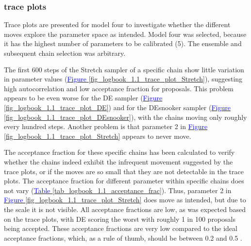 \subsubsection{trace plots} %
Trace plots are presented for model four to investigate whether the different moves explore the parameter space as intended. Model four was selected, because it has the highest number of parameters to be calibrated (5). The ensemble and subsequent chain selection was arbitrary. 

The first 600 steps of the Stretch sampler of a specific chain show little variation in parameter values (\hyperref[fig_logbook_1.1_trace_plot_Stretch]{\textcolor{blue}{Figure }\ref{fig_logbook_1.1_trace_plot_Stretch}}), suggesting high autocorrelation and low acceptance fraction for proposals. This problem appears to be even worse for the DE sampler (\hyperref[fig_logbook_1.1_trace_plot_DE]{\textcolor{blue}{Figure }\ref{fig_logbook_1.1_trace_plot_DE}}) and for the DEsnooker sampler (\hyperref[fig_logbook_1.1_trace_plot_DEsnooker]{\textcolor{blue}{Figure }\ref{fig_logbook_1.1_trace_plot_DEsnooker}}), with the chains moving only roughly every hundred steps. Another problem is that parameter 2 in \hyperref[fig_logbook_1.1_trace_plot_Stretch]{\textcolor{blue}{Figure }\ref{fig_logbook_1.1_trace_plot_Stretch}} appears to never move. 

The acceptance fraction for these specific chains has been calculated to verify whether the chains indeed exhibit the infrequent movement suggested by the trace plots, or if the moves are so small that they are not detectable in the trace plots. The acceptance fraction for different parameter within specific chains does not vary (\hyperref[tab_logbook_1.1_acceptance_frac]{\textcolor{blue}{Table }\ref{tab_logbook_1.1_acceptance_frac}}). Thus, parameter 2 in \hyperref[fig_logbook_1.1_trace_plot_Stretch]{\textcolor{blue}{Figure }\ref{fig_logbook_1.1_trace_plot_Stretch}} does move as intended, but due to the scale it is not visible. All acceptance fractions are low, as was expected based on the trace plots, with DE scoring the worst with roughly 1 in 100 proposals being accepted. These acceptance fractions are very low compared to the ideal acceptance fractions, which, as a rule of thumb, should be between 0.2 and 0.5 \citep{foreman2013emcee}. 


